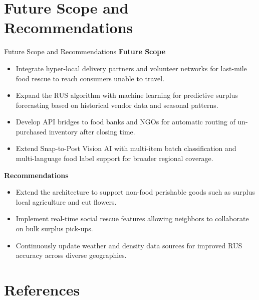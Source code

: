 \documentclass[aspectratio=169,xcolor=dvipsnames]{beamer}
\begin{document}
\section{Future Scope and Recommendations}
\begin{frame}{Future Scope and Recommendations}
\justifying
\textbf{Future Scope}
\begin{itemize}
    \item Integrate hyper-local delivery partners and volunteer networks for last-mile food rescue to reach consumers unable to travel.
    
    \item Expand the RUS algorithm with machine learning for predictive surplus forecasting based on historical vendor data and seasonal patterns.
    
    \item Develop API bridges to food banks and NGOs for automatic routing of un-purchased inventory after closing time.
    
    \item Extend Snap-to-Post Vision AI with multi-item batch classification and multi-language food label support for broader regional coverage.
\end{itemize}

\textbf{Recommendations}
\begin{itemize}
    \item Extend the architecture to support non-food perishable goods such as surplus local agriculture and cut flowers.
    
    \item Implement real-time social rescue features allowing neighbors to collaborate on bulk surplus pick-ups.
    
    \item Continuously update weather and density data sources for improved RUS accuracy across diverse geographies.
\end{itemize}
\end{frame}

\section{References}
\end{document}
